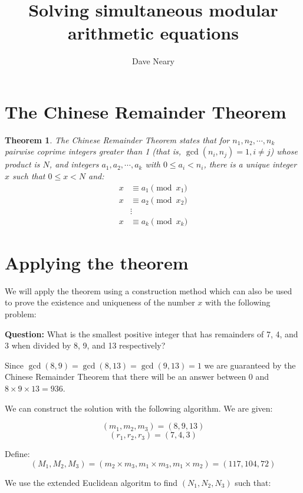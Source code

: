 \documentclass{article}
\newtheorem{theorem}{Theorem}[section]
\begin{document}
\title{Solving simultaneous modular arithmetic equations}
\author{Dave Neary}

\maketitle

\section{The Chinese Remainder Theorem}

\begin{theorem}
	The Chinese Remainder Theorem states that for $n_1,n_2,\cdots,n_k$ pairwise
	coprime integers greater than 1 (that is, $\gcd(n_i,n_j) = 1, i \neq j$)
	whose product is $N$, and integers $a_1,a_2,\cdots,a_k$ with
	$0\leq a_i < n_i$, there is a unique integer $x$ such that $0 \leq x < N$
	and:
	\begin{align*}
		x &\equiv a_1 \pmod{x_1} \\
		x &\equiv a_2 \pmod{x_2} \\
		& \vdots  \\
		x &\equiv a_k \pmod{x_k}
	\end{align*}
\end{theorem}

\section{Applying the theorem}

We will apply the theorem using a construction method which can also be used to
prove the existence and uniqueness of the number $x$ with the following problem:

\textbf{Question:} What is the smallest positive integer that has remainders of 7, 4, and 3
when divided by 8, 9, and 13 respectively?

Since $\gcd(8,9) = \gcd(8,13) = \gcd(9,13) = 1$ we are guaranteed by the Chinese
Remainder Theorem that there will be an answer between 0 and $8\times9\times13 = 936$.

We can construct the solution with the following algorithm. We are given:

\[(m_1,m_2,m_3) = (8,9,13)\]
\[(r_1,r_2,r_3) = (7,4,3)\]

Define:
\[(M_1,M_2,M_3) = (m_2\times m_3,m_1 \times m_3, m_1 \times m_2) = (117,104,72)\]

We use the extended Euclidean algoritm to find $(N_1,N_2,N_3)$ such that:
\end{document}
